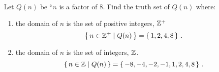 \guard



\begin{exmp}
\label{exmp:truthSetOverIntegers}
  Let $Q(n)$ be ``$n$ is a factor of $8$.
  Find the truth set of $Q(n)$ where:
  \begin{enumerate}
    \item the domain of $n$ is the set of positive integers, $\mathbb{Z}^+$
      \[ \left\{\, n\in\mathbb{Z}^+ \mid Q(n)\,\right\} = \left\{\,1,2,4,8\,\right\}\,.\]
    \item the domain of $n$ is the set of integers, $\mathbb{Z}$.
      \[ \left\{\, n\in\mathbb{Z} \mid Q(n)\,\right\} = \left\{\,-8,-4,-2,-1,1,2,4,8\,\right\}\,.\]
  \end{enumerate}
\end{exmp}
